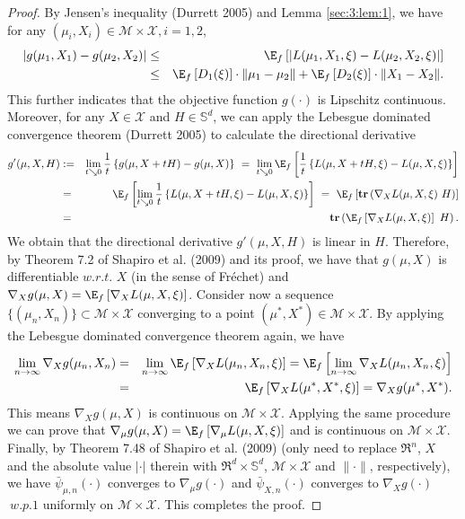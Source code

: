\begin{proof}
By Jensen's inequality (Durrett 2005) and Lemma \ref{sec:3:lem:1},
we have for any $(\mu_i,X_i)\in \mathcal{M}\times\mathcal
{X},i=1,2$,
\begin{eqnarray*}
|g(\mu_1,X_1)-g(\mu_2,X_2)|&\le&
\E_f\left[|L(\mu_1,X_1,\xi)-L(\mu_2,X_2,\xi)|\right]\\
&\le&
\E_f\left[D_1(\xi)\right]\cdot\|\mu_1-\mu_2\|+\E_f\left[D_2(\xi)\right]
\cdot\|X_1-X_2\|.
\end{eqnarray*}
This further indicates that the objective function $g(\cdot)$ is
Lipschitz continuous. Moreover, for any $X\in \mathcal{X}$ and $H\in
\mathbb S^d$, we can apply the Lebesgue dominated convergence
theorem (Durrett 2005) to calculate the directional derivative
\begin{eqnarray*}
g'(\mu,X,H)&:=&\lim_{t\searrow
0}\frac{1}{t}\left\{g(\mu,X+tH)-g(\mu,X)\right\}\ = \
\lim_{t\searrow
0}\E_f\left[\frac{1}{t}\left\{L(\mu,X+tH,\xi)-L(\mu,X,\xi)\right\}
\right]\\
&=& \E_f\left[\lim_{t\searrow
0}\frac{1}{t}\left\{L(\mu,X+tH,\xi)-L(\mu,X,\xi)\right\}\right]\ = \
\E_f\left[{\bf tr}\left(\nabla_X L(\mu,X,\xi)\ H\right)\right]\\
& =& {\bf tr}\left(\E_f\left[\nabla_X L(\mu,X,\xi)\right]\ H\right).
\end{eqnarray*}
We obtain that the directional derivative $g'(\mu,X,H)$ is linear in
$H$. Therefore, by Theorem 7.2 of Shapiro et al. (2009) and its
proof, we have that $g(\mu,X)$ is differentiable $w.r.t.$ $X$ (in
the sense of Fr\'{e}chet) and $\nabla_X g(\mu,X)=\E_f\left[\nabla_X
L(\mu,X,\xi)\right]$. Consider now a sequence
$\{(\mu_n,X_n)\}\subset \mathcal{M}\times\mathcal {X}$ converging to
a point $(\mu^*,X^*)\in \mathcal{M}\times\mathcal {X}$. By applying
the Lebesgue dominated convergence theorem again, we have
\begin{eqnarray*}
\lim_{n\to \infty}\nabla_X g(\mu_n,X_n)&=&\lim_{n\to
\infty}\E_f\left[\nabla_X
L(\mu_n,X_n,\xi)\right]=\E_f\left[\lim_{n\to \infty}\nabla_X
L(\mu_n,X_n,\xi)\right]\\
&=&\E_f\left[\nabla_X L(\mu^*,X^*,\xi)\right]=\nabla_X g(\mu^*,X^*).
\end{eqnarray*}
This means $\nabla_X g(\mu,X)$ is continuous on
$\mathcal{M}\times\mathcal {X}$. Applying the same procedure we can
prove that $\nabla_{\mu} g(\mu,X)=\E_f\left[\nabla_{\mu}
L(\mu,X,\xi)\right]$ and is continuous on $\mathcal{M}\times\mathcal
{X}$. Finally, by Theorem 7.48 of Shapiro et al. (2009) (only need
to replace $\Re^n$, $X$ and the absolute value $|\cdot|$ therein
with $\Re^d\times\mathbb{S}^d$, $\mathcal{M}\times\mathcal{X}$ and
$\|\cdot\|$, respectively), we have $\bar \psi_{\mu,n}(\cdot)$
converges to $\nabla_{\mu} g(\cdot)$ and $\bar \psi_{X,n}(\cdot)$
converges to $\nabla_X g(\cdot)$ $~w.p.1$ uniformly on
$\mathcal{M}\times\mathcal {X}$. This completes the proof.
\end{proof}

